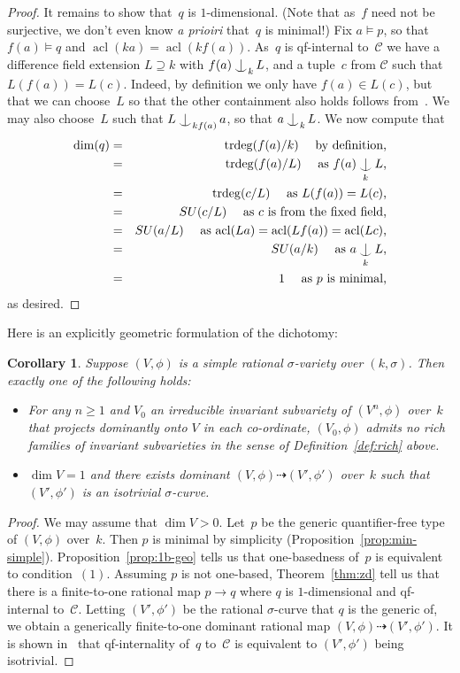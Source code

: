 \documentclass[\DocOpts]{amsart}
\newtheorem{corollary}[theorem]{Corollary}
\theoremstyle{definition}
\def\acl{\operatorname{acl}}
\def\trdeg{\operatorname{trdeg}}
\def\C{\mathcal{C}}
\newcommand{\<}{\langle}
\renewcommand{\>}{\rangle}
\newcommand{\dto}{\dashrightarrow}
\def\Ind#1#2{#1\setbox0=\hbox{\(#1x\)}\kern\wd0\hbox to 
0pt{\hss\(#1\mid\)\hss}\lower.9\ht0\hbox to 
0pt{\hss\(#1\smile\)\hss}\kern\wd0}
\def\ind{\mathop{\mathpalette\Ind{}}}
\begin{document}
\begin{proof}
It remains to show that~$q$ is $1$-dimensional.
(Note that as~$f$ need not be surjective, we don't even know {\em a prioiri} that~$q$ is minimal!)
Fix $a\models p$, so that $f(a)\models q$ and $\acl(ka)=\acl(kf(a))$.
As~$q$ is qf-internal to~$\C$ we have a difference field extension $L\supseteq k$ with $f(a)\ind_kL$, and a tuple~$c$ from $\C$ such that $L(f(a))=L(c)$.
Indeed, by definition we only have $f(a)\in L(c)$, but that we can choose~$L$ so that the other containment also holds follows from~\cite[Proposition~2.11]{qfint}.
We may also choose~$L$ such that $L\ind_{kf(a)}a$, so that $a\ind_kL$.
We now compute that
\begin{eqnarray*}
\dim(q)
&=&
\trdeg(f(a)/k)\ \ \ \text{ by definition,}\\
&=& \trdeg(f(a)/L)\ \ \ \text{ as $f(a)\ind_kL$,}\\
&=&
\trdeg(c/L)\ \ \ \text{ as $L(f(a))=L(c)$,}\\
&=&
SU(c/L)\ \ \ \text{ as $c$ is from the fixed field,}\\
&=&
SU(a/L)\ \ \ \text{ as $\acl(La)=\acl(Lf(a))=\acl(Lc)$,}\\
&=&
SU(a/k)\ \ \ \text{ as $a\ind_kL$,}\\
&=&
1\ \ \ \text{ as $p$ is minimal,}
\end{eqnarray*}
as desired.
\end{proof}

Here is an explicitly geometric formulation of the dichotomy:

\begin{corollary}
\label{cor:zd}
Suppose $(V,\phi)$ is a simple rational $\sigma$-variety over $(k,\sigma)$.
Then exactly one of the following holds:
\begin{itemize}
\item[(1)]
For any $n\geq 1$ and $V_0$ an irreducible invariant subvariety of $(V^n,\phi)$ over~$k$ that projects dominantly onto $V$ in each co-ordinate, $(V_0,\phi)$ admits no rich families of invariant subvarieties in the sense of Definition~\ref{def:rich} above.
\item[(2)]
$\dim V=1$ and there exists dominant $(V,\phi)\dto(V',\phi')$ over~$k$ such that $(V',\phi')$ is an isotrivial $\sigma$-curve.
\end{itemize}
\end{corollary}

\begin{proof}
We may assume that $\dim V>0$.
Let~$p$ be the generic quantifier-free type of $(V,\phi)$ over~$k$.
Then $p$ is minimal by simplicity (Proposition~\ref{prop:min-simple}).
Proposition~\ref{prop:1b-geo} tells us that one-basedness of~$p$ is equivalent to condition~$(1)$.
Assuming $p$ is not one-based, Theorem~\ref{thm:zd} tell us that there is a finite-to-one rational map $p\to q$ where $q$ is $1$-dimensional and qf-internal to~$\C$.
Letting $(V',\phi')$ be the rational $\sigma$-curve that $q$ is the generic of, we obtain a generically finite-to-one dominant rational map $(V,\phi)\dto(V',\phi')$.
It is shown in~\cite[Proposition~3.6]{qfint} that qf-internality of~$q$ to~$\C$ is equivalent to $(V',\phi')$ being isotrivial.
\end{proof}
\end{document}
